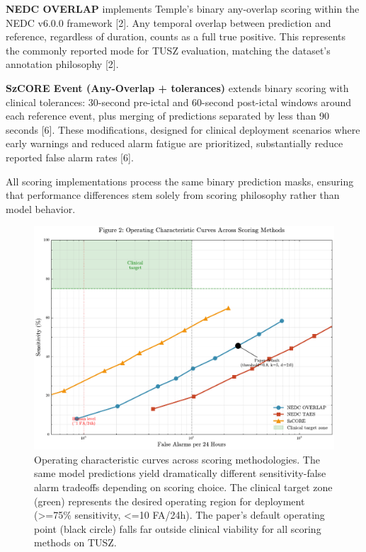 \textbf{NEDC OVERLAP} implements Temple's binary any-overlap scoring
within the NEDC v6.0.0 framework {[}2{]}. Any temporal overlap between
prediction and reference, regardless of duration, counts as a full true
positive. This represents the commonly reported mode for TUSZ
evaluation, matching the dataset's annotation philosophy {[}2{]}.

\textbf{SzCORE Event (Any-Overlap + tolerances)} extends binary scoring
with clinical tolerances: 30-second pre-ictal and 60-second post-ictal
windows around each reference event, plus merging of predictions
separated by less than 90 seconds {[}6{]}. These modifications, designed
for clinical deployment scenarios where early warnings and reduced alarm
fatigue are prioritized, substantially reduce reported false alarm rates
{[}6{]}.

All scoring implementations process the same binary prediction masks,
ensuring that performance differences stem solely from scoring
philosophy rather than model behavior.

\begin{figure}
\hypertarget{fig:operating-curves}{%
\centering
\includegraphics[width=1\textwidth,height=\textheight]{figures/output/arxiv/fig2_operating_curves.pdf}
\caption{Operating characteristic curves across scoring methodologies.
The same model predictions yield dramatically different
sensitivity-false alarm tradeoffs depending on scoring choice. The
clinical target zone (green) represents the desired operating region for
deployment (\textgreater=75\% sensitivity, \textless=10 FA/24h). The
paper's default operating point (black circle) falls far outside
clinical viability for all scoring methods on
TUSZ.}\label{fig:operating-curves}
}
\end{figure}


